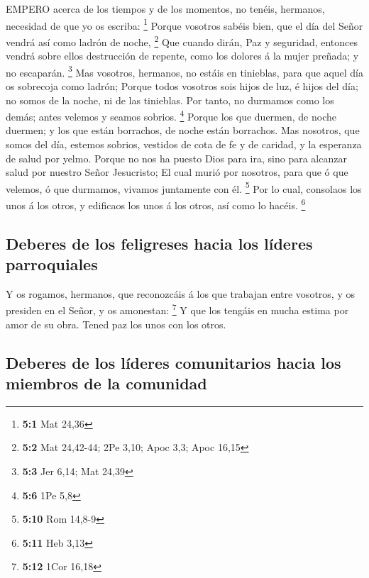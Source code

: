  EMPERO acerca de los tiempos y de los momentos, no tenéis,
hermanos, necesidad de que yo os escriba: \footnote{\textbf{5:1} Mat
  24,36}  Porque vosotros sabéis bien, que el día del Señor
vendrá así como ladrón de noche, \footnote{\textbf{5:2} Mat 24,42-44;
  2Pe 3,10; Apoc 3,3; Apoc 16,15}  Que cuando dirán, Paz y
seguridad, entonces vendrá sobre ellos destrucción de repente, como los
dolores á la mujer preñada; y no escaparán. \footnote{\textbf{5:3} Jer
  6,14; Mat 24,39}  Mas vosotros, hermanos, no estáis en
tinieblas, para que aquel día os sobrecoja como ladrón; 
Porque todos vosotros sois hijos de luz, é hijos del día; no somos de la
noche, ni de las tinieblas.  Por tanto, no durmamos como los
demás; antes velemos y seamos sobrios. \footnote{\textbf{5:6} 1Pe 5,8}
 Porque los que duermen, de noche duermen; y los que están
borrachos, de noche están borrachos.  Mas nosotros, que
somos del día, estemos sobrios, vestidos de cota de fe y de caridad, y
la esperanza de salud por yelmo.  Porque no nos ha puesto
Dios para ira, sino para alcanzar salud por nuestro Señor Jesucristo;
 El cual murió por nosotros, para que ó que velemos, ó que
durmamos, vivamos juntamente con él. \footnote{\textbf{5:10} Rom 14,8-9}
 Por lo cual, consolaos los unos á los otros, y edificaos
los unos á los otros, así como lo hacéis. \footnote{\textbf{5:11} Heb
  3,13}

\hypertarget{deberes-de-los-feligreses-hacia-los-luxedderes-parroquiales}{%
\subsection{Deberes de los feligreses hacia los líderes
parroquiales}\label{deberes-de-los-feligreses-hacia-los-luxedderes-parroquiales}}

 Y os rogamos, hermanos, que reconozcáis á los que trabajan
entre vosotros, y os presiden en el Señor, y os amonestan: \footnote{\textbf{5:12}
  1Cor 16,18}  Y que los tengáis en mucha estima por amor
de su obra. Tened paz los unos con los otros.

\hypertarget{deberes-de-los-luxedderes-comunitarios-hacia-los-miembros-de-la-comunidad}{%
\subsection{Deberes de los líderes comunitarios hacia los miembros de la
comunidad}\label{deberes-de-los-luxedderes-comunitarios-hacia-los-miembros-de-la-comunidad}}

